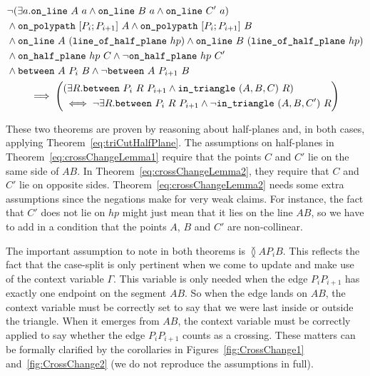 \begin{multline}\label{eq:crossChangeLemma2}
  \begin{aligned}
    &\neg(\exists a.\texttt{on\_line}\ A\ a\wedge \texttt{on\_line}\ B\ a\wedge \texttt{on\_line}\ C'\ a)\\
    &\wedge \texttt{on\_polypath}\ [P_i;P_{i+1}]\ A \wedge \texttt{on\_polypath}\ [P_i;P_{i+1}]\ B\\
    &\wedge\texttt{on\_line}\ A\ (\texttt{line\_of\_half\_plane}\ hp) \wedge \texttt{on\_line}\ B\ (\texttt{line\_of\_half\_plane}\ hp)\\
    &\wedge\texttt{on\_half\_plane}\ hp\ C \wedge \neg\texttt{on\_half\_plane}\ hp\ C'\\
    &\wedge \texttt{between}\ A\ P_i\ B \wedge \neg\texttt{between}\ A\ P_{i+1}\ B
  \end{aligned}\\
  \implies\left(\begin{aligned}
      &(\exists R. \texttt{between}\ P_i\ R\ P_{i+1} \wedge \texttt{in\_triangle}\ (A,B,C)\ R)\\
      &\iff\neg \exists R. \texttt{between}\ P_i\ R\ P_{i+1} \wedge \neg\texttt{in\_triangle}\ (A,B,C')\ R
  \end{aligned}\right)
\end{multline}

These two theorems are proven by reasoning about half-planes and, in both cases, applying Theorem~\ref{eq:triCutHalfPlane}. The assumptions on half-planes in Theorem~\ref{eq:crossChangeLemma1} require that the points $C$ and $C'$ lie on the same side of $AB$. In Theorem~\ref{eq:crossChangeLemma2}, they require that $C$ and $C'$ lie on opposite sides. Theorem~\ref{eq:crossChangeLemma2} needs some extra assumptions since the negations make for very weak claims. For instance, the fact that $C'$ does not lie on $hp$ might just mean that it lies on the line $AB$, so we have to add in a condition that the points $A$, $B$ and $C'$ are non-collinear.

The important assumption to note in both theorems is $\between{A}{P_i}{B}$. This reflects the fact that the case-split is only pertinent when we come to update and make use of the context variable $\Gamma$. This variable is only needed when the edge $P_iP_{i+1}$ has exactly one endpoint on the segment $AB$. So when the edge lands on $AB$, the context variable must be correctly set to say that we were last inside or outside the triangle. When it emerges from $AB$, the context variable must be correctly applied to say whether the edge $P_iP_{i+1}$ counts as a crossing. These matters can be formally clarified by the corollaries in Figures~\ref{fig:CrossChange1} and~\ref{fig:CrossChange2} (we do not reproduce the assumptions in full).

